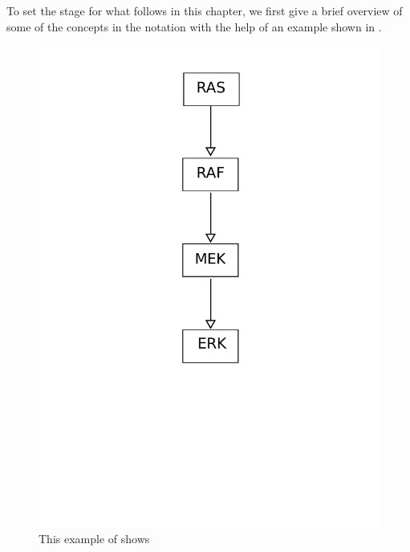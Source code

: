 To set the stage for what follows in this chapter, we first give a brief overview of some of the concepts in the \AF notation with the help of an example shown in .

\begin{figure}[H]
  \centering
  \vspace*{-0.75em}
\includegraphics[scale=0.5]{examples/ras-pathway}
  \caption{This example of \AF shows}
  \label{fig:af:1}
\end{figure}

